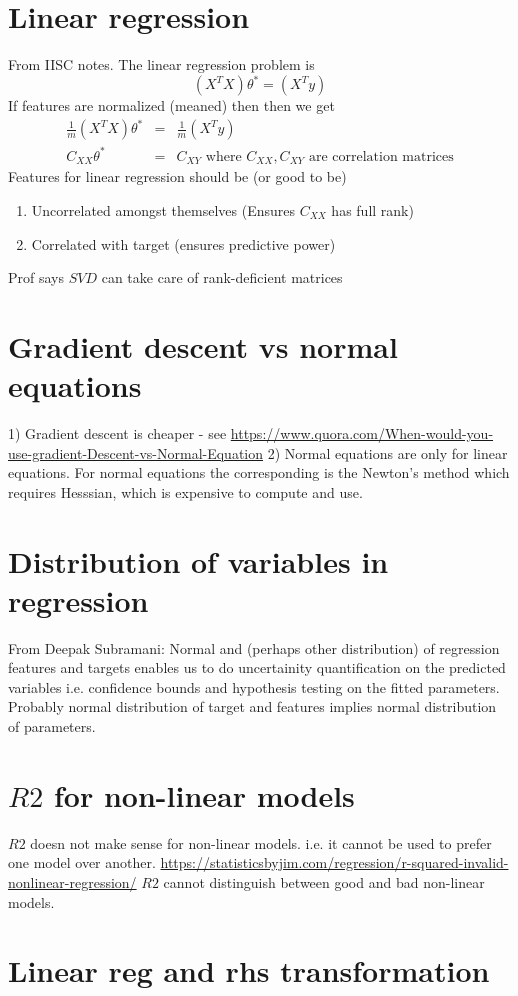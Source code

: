 \documentclass{article}
\newcommand{\beq}{\begin{equation}}
\newcommand{\eeq}{\end{equation}}
\newcommand{\ber}{\begin{eqnarray}}
\newcommand{\eer}{\end{eqnarray}}
\begin{document}
\section{Linear regression}
From IISC notes. The linear regression problem is
\beq
(X^TX)\theta^{*} = (X^Ty) 
\eeq
If features are normalized (meaned) then then we get
\ber
\frac{1}{m}(X^TX)\theta^{*} &=& \frac{1}{m}(X^Ty)  \\
C_{XX}\theta^{*} &=& C_{XY} \text{    where $C_{XX},C_{XY}$ are correlation matrices}
\eer
Features for linear regression should be (or good to be)
\begin{enumerate}
\item{Uncorrelated amongst themselves (Ensures $C_{XX}$ has full rank)}
\item{Correlated with target (ensures predictive power)}  
\end{enumerate}
Prof says $SVD$ can take care of rank-deficient matrices
%
%
%
\section{Gradient descent vs normal equations}
1) Gradient descent is cheaper - see \url{https://www.quora.com/When-would-you-use-gradient-Descent-vs-Normal-Equation}
2) Normal equations are only for linear equations. For normal equations the corresponding is the Newton's method which requires Hesssian, which is expensive to compute and use.
%
%
%
\section{Distribution of variables in regression}
From Deepak Subramani: Normal and (perhaps other distribution) of regression features and targets enables us to do uncertainity quantification on the predicted variables i.e. confidence bounds and hypothesis testing on the fitted parameters. Probably normal distribution of target and features implies normal distribution of parameters.

\section{$R2$ for non-linear models}
$R2$ doesn not make sense for non-linear models. i.e. it cannot be used to prefer one model over another.
\url{https://statisticsbyjim.com/regression/r-squared-invalid-nonlinear-regression/} $R2$ cannot distinguish between good and bad non-linear models.

\section{Linear reg and rhs transformation}
\end{document}
